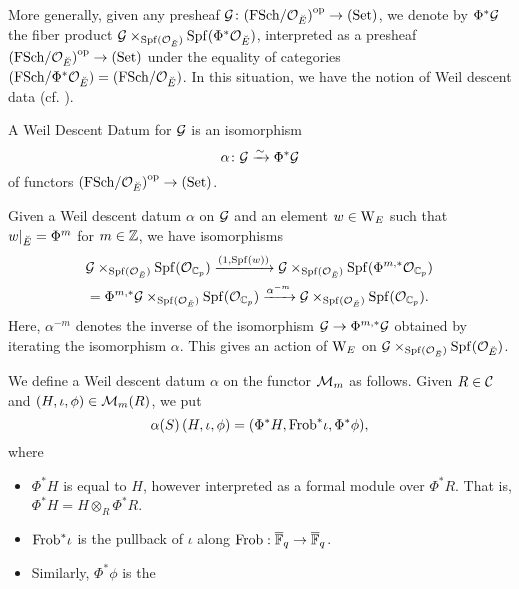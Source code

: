 \documentclass[../main.tex]{subfiles}
\begin{document}
More generally, given any presheaf $\mathcal{G} \colon {(\mathrm{FSch}/{\mathcal{O}_{\breve {E}}})}^{\mathrm{op}}
\to {(\mathrm{Set})}$, we denote by
$\Phi^* \mathcal{G}$ the fiber product $\mathcal{G} \times_{\operatorname{Spf}(\mathcal{O}_{\breve {E}})} \operatorname{Spf}(\Phi^*
\mathcal{O}_{\breve {E}})$, interpreted as a presheaf ${(\mathrm{FSch}/{\mathcal{O}_{\breve {E}}})}^{\mathrm{op}} \to {(\mathrm{Set})}$ under the
equality of categories ${(\mathrm{FSch}/{\Phi^*\mathcal{O}_{\breve {E}}})} = {(\mathrm{FSch}/{\mathcal{O}_{\breve {E}}})}$. In
this situation, we have the notion of Weil descent data
(cf. \cite[Definition 3.45]{rapoport1996period}).

\begin{defi}\label{def:WeilDescentDatum}
  A Weil Descent Datum for $\mathcal{G}$ is an isomorphism
  \begin{equation*}
    \alpha \colon \mathcal{G} \xrightarrow{\sim} \Phi^* \mathcal{G}
  \end{equation*}
  of functors ${(\mathrm{FSch}/{\mathcal{O}_{\breve {E}}})}^{\mathrm{op}} \to {(\mathrm{Set})}$.
\end{defi}

Given a Weil descent datum $\alpha$ on $\mathcal{G}$ and an element $w \in \mathrm W_E$
such that $w|_{{\breve {E}}} = \Phi^m$ for $m \in \mathbb{Z}$, we have isomorphisms
\begin{multline}\label{eq:ActionFromWeilDD}
  \mathcal{G} \times_{\operatorname{Spf}(\mathcal{O}_{\breve {E}})} \operatorname{Spf}(\mathcal{O}_{\mathbb{C}_p}) \xrightarrow{(1, \operatorname{Spf}(w))} 
  \mathcal{G} \times_{\operatorname{Spf}(\mathcal{O}_{\breve {E}})} \operatorname{Spf}(\Phi^{m,*}\mathcal{O}_{\mathbb{C}_p}) \\
  = \Phi^{m, *} \mathcal{G} \times_{\operatorname{Spf}(\mathcal{O}_{\breve {E}})} \operatorname{Spf}(\mathcal{O}_{\mathbb{C}_p})
  \xrightarrow{\alpha^{-m}} \mathcal{G} \times_{\operatorname{Spf}(\mathcal{O}_{\breve {E}})} \operatorname{Spf}(\mathcal{O}_{\mathbb{C}_p}).
\end{multline}
Here, $\alpha^{-m}$ denotes the inverse of the isomorphism $\mathcal{G} \to 
\Phi^{m, *} \mathcal{G}$ obtained by iterating the isomorphism $\alpha$. This
gives an action of $\mathrm W_E$ on $\mathcal{G} \times_{\operatorname{Spf}(\mathcal{O}_{\breve {E}})} \operatorname{Spf}(\mathcal{O}_{{\breve {E}}})$. 

We define a Weil descent datum $\alpha$ on the functor $\mathcal{M}_m$ as follows. 
Given $R\in \mathcal{C}$ and $(H, \iota, \phi) \in \mathcal{M}_m(R)$, we put
\begin{equation*}
  \alpha(S) \left( H, \iota, \phi \right) = (\Phi^*H, \mathrm{Frob}^* \iota,\Phi^* \phi),
\end{equation*}
where
\begin{itemize}
  \item $\Phi^* H$ is equal to $H$, however interpreted as a formal module over $\Phi^*R$.
    That is, $\Phi^* H = H \otimes_{R} \Phi^* R$.
  \item $\mathrm{Frob}^* \iota$ is the pullback of $\iota$ along $\mathrm{Frob}: \overline {\mathbb{F}}_q
    \to \overline {\mathbb{F}}_q$.
  \item Similarly, $\Phi^* \phi$ is the 

\end{itemize}
\end{document}
